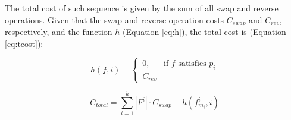 \documentclass[paper=a4, fontsize=12pt]{scrartcl}
\begin{document}
	The total cost of such sequence	is given by the sum of all swap and reverse operations. Given that the swap and reverse operation costs $C_{swap}$ and $C_{rev}$, respectively, and the function $h$ (Equation \ref{eq:h}), the total cost is (Equation \ref{eq:tcost}):
	
	\begin{equation}
	\label{eq:h}
	h(f, i)=
	\begin{cases}
	0,& \textrm{if $f$ satisfies $p_i$} \\
	C_{rev}&
	\end{cases}
	\end{equation}
	
	\begin{equation}
	\label{eq:tcost}
	C_{total}=\sum_{i=1}^{k}{|F^i| \cdot C_{swap} + h(f^i_{m_i}, i)}
	\end{equation}
\end{document}
